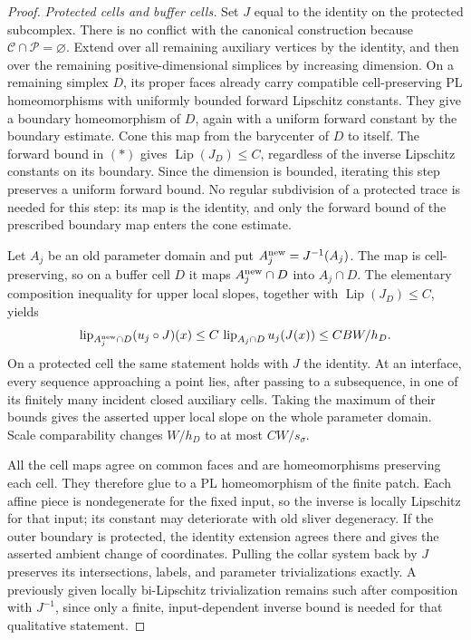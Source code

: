 \documentclass[11pt]{article}
\numberwithin{equation}{section}
\theoremstyle{definition}
\theoremstyle{remark}
\begin{document}
\begin{proof}
\emph{Protected cells and buffer cells.}
Set $J$ equal to the identity on the protected subcomplex.
There is no conflict with the canonical construction because
$\mathcal C\cap\mathcal P=\varnothing$.  Extend over all remaining
auxiliary vertices by the identity, and then over the remaining
positive-dimensional simplices by increasing dimension.  On a remaining
simplex $D$, its proper faces already carry compatible
cell-preserving PL homeomorphisms with uniformly bounded forward
Lipschitz constants.  They give a boundary homeomorphism of $D$,
again with a uniform forward constant by the boundary estimate.
Cone this map from the barycenter of $D$ to itself.  The forward
bound in $(*)$ gives $\operatorname{Lip}(J_D)\leq C$, regardless of the inverse
Lipschitz constants on its boundary.  Since the dimension is
bounded, iterating this step preserves a uniform forward bound.
No regular subdivision of a protected trace is needed for this
step: its map is the identity, and only the forward bound of the
prescribed boundary map enters the cone estimate.

Let $A_j$ be an old parameter domain and put
$A_j^{\rm new}=J^{-1}(A_j)$.  The map is cell-preserving, so on a
buffer cell $D$ it maps $A_j^{\rm new}\cap D$ into $A_j\cap D$.
The elementary composition inequality for upper local slopes,
together with $\operatorname{Lip}(J_D)\leq C$, yields
\[
 \operatorname{lip}_{A_j^{\rm new}\cap D}(u_j\circ J)(x)
 \leq C\,\operatorname{lip}_{A_j\cap D}u_j(J(x))
 \leq C B W/h_D.
\]
On a protected cell the same statement holds with $J$ the identity.
At an interface, every sequence approaching a point lies, after
passing to a subsequence, in one of its finitely many incident
closed auxiliary cells.  Taking the maximum of their bounds gives
the asserted upper local slope on the whole parameter domain.
Scale comparability changes $W/h_D$ to at most $C W/s_\sigma$.

All the cell maps agree on common faces and are homeomorphisms
preserving each cell.  They therefore glue to a PL homeomorphism
of the finite patch.  Each affine piece is nondegenerate for the
fixed input, so the inverse is locally Lipschitz for that input;
its constant may deteriorate with old sliver degeneracy.  If the
outer boundary is protected, the identity extension agrees there
and gives the asserted ambient change of coordinates.  Pulling
the collar system back by $J$ preserves its intersections, labels,
and parameter trivializations exactly.  A previously given
locally bi-Lipschitz trivialization remains such after composition
with $J^{-1}$, since only a finite, input-dependent inverse bound
is needed for that qualitative statement.
\end{proof}
\end{document}
